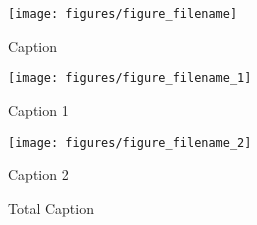 %
%
% 


%
\begin{figure}[tb]
\begin{center}
\texttt{[image: figures/figure\_filename]}
\caption{Caption}
\label{fig:descriptive_label}
\end{center}
\vspace{-0.2in}
\end{figure}
%


%
\begin{figure}[tb]
\begin{center}
\begin{minipage}{0.45\textwidth}
\begin{center}
\texttt{[image: figures/figure\_filename\_1]}
\caption{Caption 1}
\label{fig:label_1}
\end{center}
\end{minipage}
\hspace{0.07\textwidth}
\begin{minipage}{0.45\textwidth}
\begin{center}
\texttt{[image: figures/figure\_filename\_2]}
\caption{Caption 2}
\label{fig:label_2}
\end{center}
\end{minipage}
\end{center}
\vspace{-0.2in}
\end{figure}
%


%
% 
%
\usepackage{subfigure}

\begin{figure}[tb]
\begin{center}
\vspace{-0.125in}
\caption{Total Caption}
\label{fig:total_label}
\end{center}
\vspace{-0.2in}
\end{figure}
%